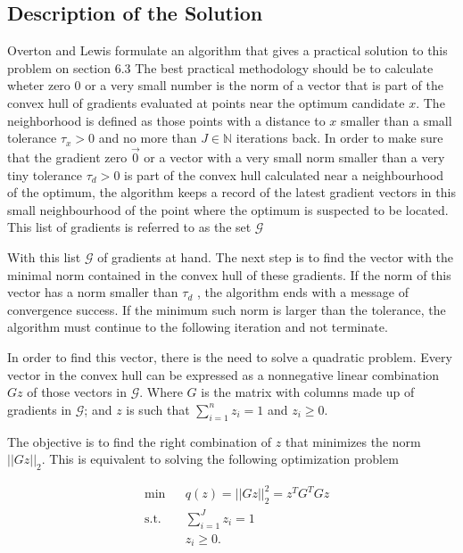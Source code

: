 \subsection{Description of the Solution}
Overton and Lewis formulate an algorithm that gives a practical solution to this problem on section $6.3$ \citep{overtonlewis}
The best practical methodology should be to calculate wheter zero $0$ or a very small number is the norm of a vector that is part of the convex hull of gradients evaluated at points near the optimum candidate $x$. The neighborhood is defined as those points with a distance to $x$ smaller than a small tolerance $\tau_x > 0$ and no more than $J \in \mathbb{N}$ iterations back. In order to make sure that the gradient zero $\vec{0}$ or a vector with a very small norm smaller than a very tiny tolerance $\tau_d > 0$ is part of the convex hull calculated near a neighbourhood of the optimum, the algorithm  keeps a record of the latest gradient vectors in this small neighbourhood of the point where the optimum is suspected to be located. This list of gradients is referred to as the set $\mathcal{G}$ \citep{overtonlewis}

With this list $\mathcal{G}$ of gradients at hand. The next step is to find the vector with the minimal norm contained in the convex hull of these gradients.  If the norm of this vector has a norm smaller than $\tau_d$ , the algorithm ends with a message of convergence success. If the minimum such norm is larger than the tolerance, the algorithm must continue to the following iteration and not terminate.

In order to find this vector, there is the need to solve a quadratic problem. Every vector in the convex hull can be expressed as a nonnegative linear combination $Gz$ of those vectors in $\mathcal{G}$. Where $G$ is the matrix with columns made up of gradients in $\mathcal{G}$; and $z$ is such that $\sum_{i=1}^n z_i = 1$ and $z_i \geq 0$.

The objective is to find the right combination of $z$ that minimizes the norm $||Gz||_2$.  This is equivalent to solving the following optimization problem

\begin{equation} \label{quadraticproblem}
  \begin{aligned}
    & {\text{min}}
    & & q(z) = ||G z ||_2^2 = z^TG^TGz  \\
    & \text{s.t.}
    & & \sum_{i = 1} ^J z_i = 1 \; \\
    & & & z_i \geq 0.
  \end{aligned}
\end{equation}

